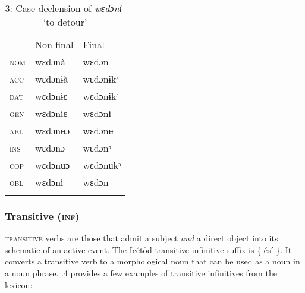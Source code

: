 \begin{table}
\caption{3: Case declension of \textit{wɛdɔnɨ- }‘to detour’}
\label{tab:8}


\begin{tabularx}{\textwidth}{XXX} & Non-final & Final\\
\lsptoprule
\textsc{nom} & wɛdɔnà & wɛdɔn\\
\textsc{acc} & wɛdɔnɨà & wɛdɔnɨkᵃ\\
\textsc{dat} & wɛdɔnɨɛ & wɛdɔnɨkᵋ\\
\textsc{gen} & wɛdɔnɨɛ & wɛdɔnɨ\\
\textsc{abl} & wɛdɔnʉɔ & wɛdɔnʉ\\
\textsc{ins} & wɛdɔnɔ & wɛdɔnᵓ\\
\textsc{cop} & wɛdɔnʉɔ & wɛdɔnʉkᵓ\\
\textsc{obl} & wɛdɔnɨ & wɛdɔn\\
\lspbottomrule
\end{tabularx}
\end{table}

\subsubsection{Transitive (\textsc{inf})}

\textsc{transitive} verbs are those that admit a subject \textit{and }a direct object into its schematic of an active event. The Icétôd transitive infinitive suffix is \{-ésí-\}. It converts a transitive verb to a morphological noun that can be used as a noun in a noun phrase. .4 provides a few examples of transitive infinitives from the lexicon:


